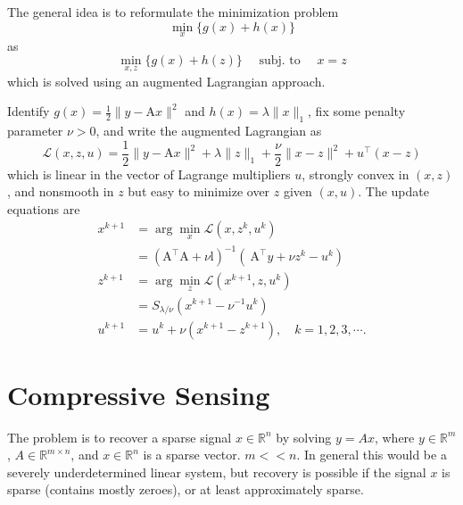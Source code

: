 \documentclass[11pt]{elegantbook}
\begin{document}
The general idea is to reformulate the minimization problem
$$
\min _x\{g(x)+h(x)\}
$$
as
$$
\min _{x, z}\{g(x)+h(z)\} \quad \text { subj. to } \quad x=z
$$
which is solved using an augmented Lagrangian approach.

Identify $g(x)=\frac{1}{2}\|y-\mathrm{A} x\|^2$ and $h(x)=\lambda\|x\|_1$, fix some penalty parameter $\nu>0$, and write the augmented Lagrangian as
$$
\mathcal{L}(x, z, u)=\frac{1}{2}\|y-\mathrm{A} x\|^2+\lambda\|z\|_1+\frac{\nu}{2}\|x-z\|^2+u^{\top}(x-z)
$$
which is linear in the vector of Lagrange multipliers $u$, strongly convex in $(x, z)$, and nonsmooth in $z$ but easy to minimize over $z$ given $(x, u)$. The update equations are
$$
\begin{aligned}
x^{k+1} &=\arg \min _x \mathcal{L}\left(x, z^k, u^k\right) \\
&=\left(\mathrm{A}^{\top} \mathrm{A}+\nu \mathrm{l}\right)^{-1}\left(\mathrm{~A}^{\top} y+\nu z^k-u^k\right) \\
z^{k+1} &=\arg \min _z \mathcal{L}\left(x^{k+1}, z, u^k\right) \\
&=S_{\lambda / \nu}\left(x^{k+1}-\nu^{-1} u^k\right) \\
u^{k+1} &=u^k+\nu\left(x^{k+1}-z^{k+1}\right), \quad k=1,2,3, \cdots .
\end{aligned}
$$

\chapter{Compressive Sensing}
The problem is to recover a sparse signal $x\in \mathbb{R}^n$ by solving $y=Ax$, where $y\in \mathbb{R}^m$, $A\in \mathbb{R}^{m\times n}$, and $x\in \mathbb{R}^n$ is a sparse vector. $m<<n$. In general this would be a severely underdetermined linear system, but recovery is possible if the signal $x$ is sparse (contains mostly zeroes), or at least approximately sparse.
\end{document}
